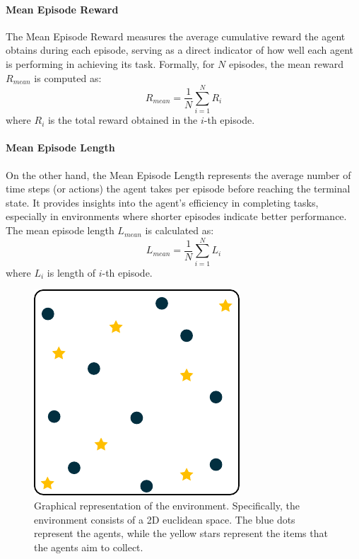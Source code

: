 \documentclass[sigconf]{acmart}
\begin{document}
\paragraph{Mean Episode Reward} 
The Mean Episode Reward measures the average cumulative reward the agent obtains during each episode, 
  serving as a direct indicator of how well each agent is performing in achieving its task.
%
Formally, for $N$ episodes, the mean reward $R_{mean}$ is computed as:
  \[ R_{mean} = \frac{1}{N} \sum_{i=1}^{N} R_i \]
  where $R_i$ is the total reward obtained in the $i$-th episode.

\paragraph{Mean Episode Length}
On the other hand, the Mean Episode Length represents the average number of time steps (or actions) 
  the agent takes per episode before reaching the terminal state. 
%
It provides insights into the agent's efficiency in completing tasks, especially in environments 
  where shorter episodes indicate better performance.
%
The mean episode length $L_{mean}$ is calculated as:
  \[ L_{mean} = \frac{1}{N} \sum_{i=1}^{N} L_i \]
  where $L_i$ is length of $i$-th episode.


\begin{figure}
  \centering
  \includegraphics[width=0.7\linewidth]{figures/env.pdf}
  \caption{Graphical representation of the environment. 
  Specifically, the environment consists of a 2D euclidean space.
  The blue dots represent the agents, while the yellow stars represent the items that 
  the agents aim to collect.
  }
  \label{fig:env}
\end{figure}
\end{document}
